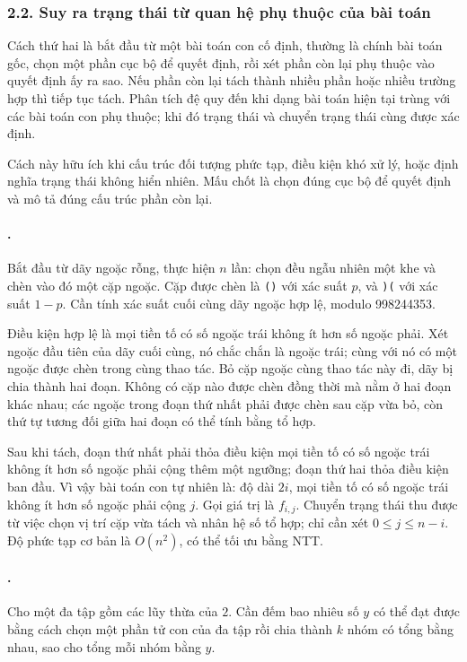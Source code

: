 \documentclass[11pt]{article}
\begin{document}
\subsubsection*{2.2. Suy ra trạng thái từ quan hệ phụ thuộc của bài toán}

Cách thứ hai là bắt đầu từ một bài toán con cố định, thường là chính bài toán
gốc, chọn một phần cục bộ để quyết định, rồi xét phần còn lại phụ thuộc vào
quyết định ấy ra sao. Nếu phần còn lại tách thành nhiều phần hoặc nhiều trường
hợp thì tiếp tục tách. Phân tích đệ quy đến khi dạng bài toán hiện tại trùng
với các bài toán con phụ thuộc; khi đó trạng thái và chuyển trạng thái cùng
được xác định.

Cách này hữu ích khi cấu trúc đối tượng phức tạp, điều kiện khó xử lý, hoặc
định nghĩa trạng thái không hiển nhiên. Mấu chốt là chọn đúng cục bộ để quyết
định và mô tả đúng cấu trúc phần còn lại.

\paragraph{.}
Bắt đầu từ dãy ngoặc rỗng, thực hiện \(n\) lần: chọn đều ngẫu nhiên một khe và
chèn vào đó một cặp ngoặc. Cặp được chèn là \texttt{()} với xác suất \(p\), và
\texttt{)(} với xác suất \(1-p\). Cần tính xác suất cuối cùng dãy ngoặc hợp lệ,
modulo 998244353.

Điều kiện hợp lệ là mọi tiền tố có số ngoặc trái không ít hơn số ngoặc phải.
Xét ngoặc đầu tiên của dãy cuối cùng, nó chắc chắn là ngoặc trái; cùng với nó
có một ngoặc được chèn trong cùng thao tác. Bỏ cặp ngoặc cùng thao tác này đi,
dãy bị chia thành hai đoạn. Không có cặp nào được chèn đồng thời mà nằm ở hai
đoạn khác nhau; các ngoặc trong đoạn thứ nhất phải được chèn sau cặp vừa bỏ,
còn thứ tự tương đối giữa hai đoạn có thể tính bằng tổ hợp.

Sau khi tách, đoạn thứ nhất phải thỏa điều kiện mọi tiền tố có số ngoặc trái
không ít hơn số ngoặc phải cộng thêm một ngưỡng; đoạn thứ hai thỏa điều kiện
ban đầu. Vì vậy bài toán con tự nhiên là: độ dài \(2i\), mọi tiền tố có số
ngoặc trái không ít hơn số ngoặc phải cộng \(j\). Gọi giá trị là \(f_{i,j}\).
Chuyển trạng thái thu được từ việc chọn vị trí cặp vừa tách và nhân hệ số tổ
hợp; chỉ cần xét \(0\le j\le n-i\). Độ phức tạp cơ bản là \(O(n^2)\), có thể
tối ưu bằng NTT.

\paragraph{.}
Cho một đa tập gồm các lũy thừa của \(2\). Cần đếm bao nhiêu số \(y\) có thể
đạt được bằng cách chọn một phần tử con của đa tập rồi chia thành \(k\) nhóm có
tổng bằng nhau, sao cho tổng mỗi nhóm bằng \(y\).
\end{document}
